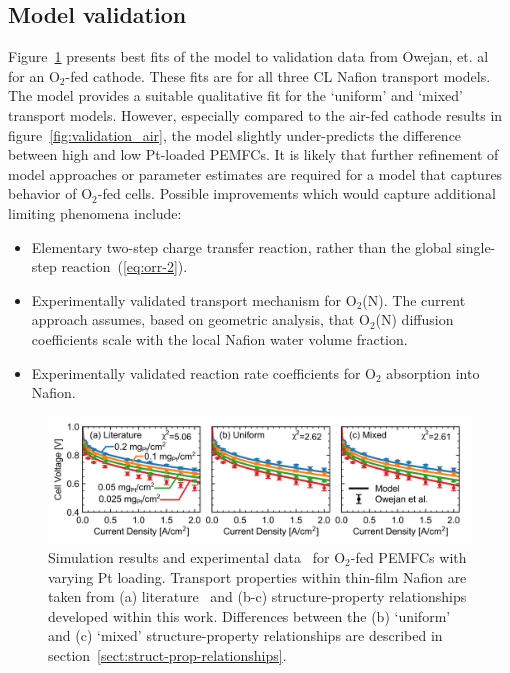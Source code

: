\documentclass[final,3p,times,onecolumn]{elsarticle}    %
\newcommand{\crr}[1]{\color{red} #1 \color{black}} %
\begin{document}
\crr{
\subsection{Model validation}}
Figure~\ref{fig:validation_o2} presents best fits of the model to validation data from Owejan, et. al~\cite{bib:owejan_2013} for an O$_2$-fed cathode. These fits are for all three CL Nafion transport models. The model provides a suitable qualitative fit for the `uniform' and `mixed' transport models. However, especially compared to the air-fed cathode results in figure~\ref{fig:validation_air}, the model slightly under-predicts the difference between high and low Pt-loaded PEMFCs. It is likely that further refinement of model approaches or parameter estimates are required for a model that captures behavior of O$_2$-fed cells. Possible improvements which would capture additional limiting phenomena include:
\begin{itemize}
    \item Elementary two-step charge transfer reaction, rather than the global single-step reaction~(\ref{eq:orr-2}).
    \item Experimentally validated transport mechanism for O$_2$(N). The current approach assumes, based on geometric analysis, that O$_2$(N) diffusion coefficients scale with the local Nafion water volume fraction.
    \item Experimentally validated reaction rate coefficients for O$_2$ absorption into Nafion.
\end{itemize}
\begin{figure}[H]
    \centering
    \includegraphics[width=6.47in]{figures/validation-o2-6_47in.png}
    \caption{Simulation results and experimental data~\cite{bib:owejan_2013} for O$_2$-fed PEMFCs with varying Pt loading. Transport properties within thin-film Nafion are taken from (a) literature~\cite{bib:yadav_2012, bib:sethuraman_2009} and (b-c) structure-property relationships developed within this work. Differences between the (b) `uniform' and (c) `mixed' structure-property relationships are described in section~\ref{sect:struct-prop-relationships}.}
    \label{fig:validation_o2}
\end{figure}
\end{document}
